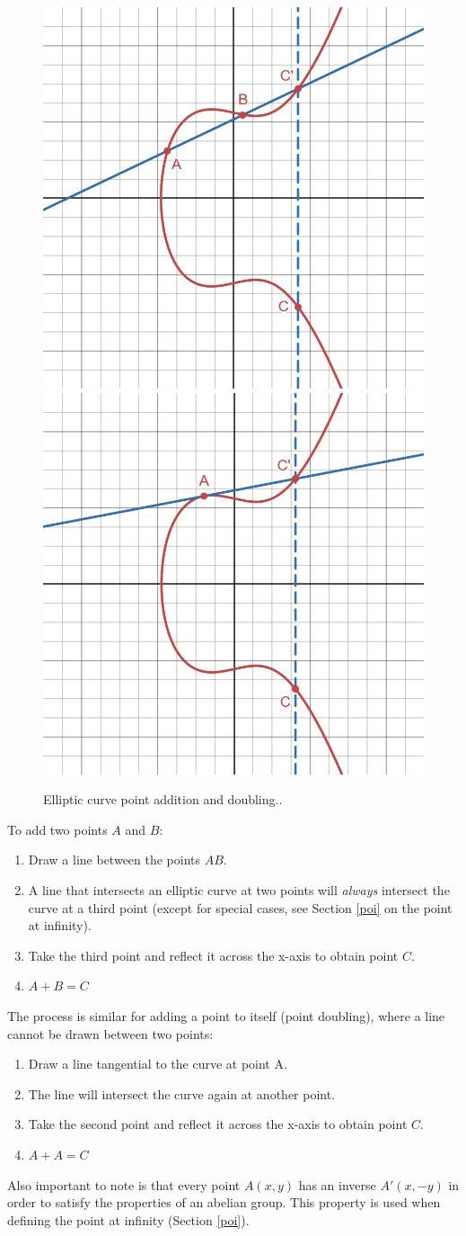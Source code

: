 \documentclass[a4paper]{article}
\begin{document}
\begin{figure}[h]
    \centering
    \includegraphics[width=0.3\linewidth]{images/add-add.png}
    \includegraphics[width=0.3\linewidth]{images/add-double.png}
    \caption{Elliptic curve point addition and doubling..}
    \label{fig:add}
\end{figure}

To add two points $A$ and $B$: 
\begin{enumerate}
    \item Draw a line between the points $AB$.
    \item A line that intersects an elliptic curve at two points will \textit{always} intersect the curve at a third point (except for special cases, see Section \ref{poi} on the point at infinity).
    \item Take the third point and reflect it across the x-axis to obtain point $C$.
    \item $A + B = C$
\end{enumerate}

The process is similar for adding a point to itself (point doubling), where a line cannot be drawn between two points:
\begin{enumerate}
    \item Draw a line tangential to the curve at point A.
    \item The line will intersect the curve again at another point.
    \item Take the second point and reflect it across the x-axis to obtain point $C$.
    \item $A + A = C$
\end{enumerate}

Also important to note is that every point $A(x, y)$ has an inverse $A'(x, -y)$ in order to satisfy the properties of an abelian group. This property is used when defining the point at infinity (Section \ref{poi}).
\end{document}
